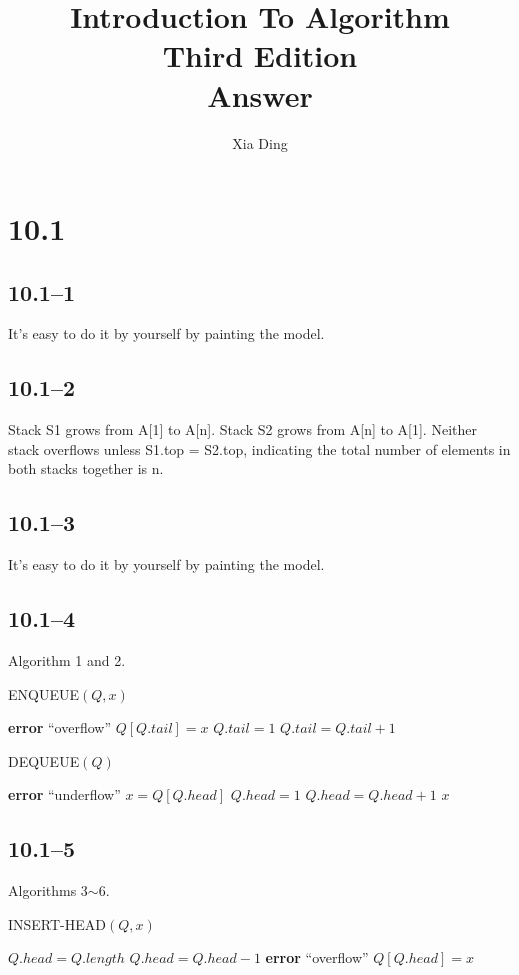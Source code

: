 \documentclass{article}
\author{Xia Ding}
\title{\textbf{Introduction To Algorithm}\\Third Edition\\\textbf{Answer}}
\begin{document}
\maketitle
\section*{10.1}
\subsection*{10.1--1}
It's easy to do it by yourself by painting the model.

\subsection*{10.1--2}
Stack S1 grows from A[1] to A[n]. Stack S2 grows from A[n] to A[1]. Neither
stack overflows unless S1.top = S2.top, indicating the total number of elements in both stacks together is n.

\subsection*{10.1--3}
It's easy to do it by yourself by painting the model.

\subsection*{10.1--4}
Algorithm 1 and 2.
\begin{algorithm}
  \caption{ENQUEUE$(Q, x)$}
  \begin{algorithmic}[1]
    \STATE \textbf{error} ``overflow''
    \ENDIF
    \STATE $Q[Q.tail] = x$
    \STATE $Q.tail = 1$
    \ELSE
    \STATE $Q.tail = Q.tail+1$
    \ENDIF
  \end{algorithmic}
\end{algorithm}

\begin{algorithm}
  \caption{DEQUEUE$(Q)$}
  \begin{algorithmic}[1]
    \STATE \textbf{error} ``underflow''
    \ENDIF
    \STATE $x = Q[Q.head]$
    \STATE $Q.head = 1$
    \ELSE
    \STATE $Q.head = Q.head+1$
    \ENDIF
    \RETURN $x$
  \end{algorithmic}
\end{algorithm}

\subsection*{10.1--5}
Algorithms 3$\sim$6.
\begin{algorithm}
  \caption{INSERT-HEAD$(Q, x)$}
  \begin{algorithmic}[1]
    \STATE $Q.head = Q.length$
    \ELSE
    \STATE $Q.head = Q.head - 1$
    \ENDIF
    \STATE \textbf{error} ``overflow''
    \ENDIF
    \STATE $Q[Q.head] = x$
  \end{algorithmic}
\end{algorithm}
\end{document}
